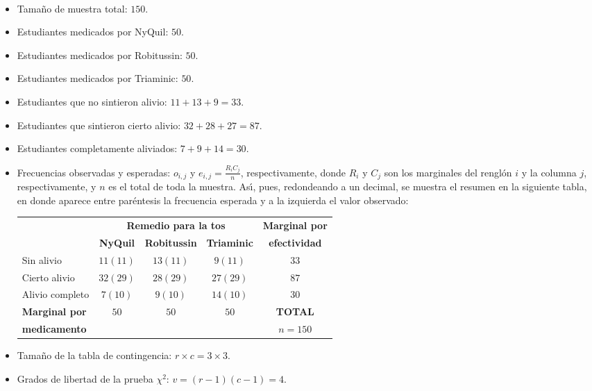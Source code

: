 \begin{solucion}
 \begin{datos}
  $\phantom{0}$
  \begin{itemize}
   \item Tamaño de muestra total: $150$.
   \item Estudiantes medicados por NyQuil: $50$.
   \item Estudiantes medicados por Robitussin: $50$.
   \item Estudiantes medicados por Triaminic: $50$.
   \item Estudiantes que no sintieron alivio: $11 + 13 + 9 = 33$.
   \item Estudiantes que sintieron cierto alivio: $32 + 28 + 27 = 87$.
   \item Estudiantes completamente aliviados: $7 + 9 + 14 = 30$.
   \item Frecuencias observadas y esperadas: $o_{i,j}$
   y $e_{i,j}=\frac{R_i C_j}{n}$, respectivamente,
   donde $R_i$ y $C_j$ son los marginales del rengl\'on $i$ y la columna $j$,
   respectivamente, y $n$ es el total de toda la muestra.
   As\'{\i}, pues, redondeando a un decimal, se muestra el resumen 
   en la siguiente tabla,
   en donde aparece entre par\'entesis la frecuencia esperada
   y a la izquierda el valor observado:
   \begin{center}
    \begin{tabular}{lccc|c}
     & \multicolumn{3}{c}{\textbf{Remedio para la tos}} &
     \textbf{Marginal por} \\
     \cline{2-4}
     & \textbf{NyQuil} & \textbf{Robitussin} & \textbf{Triaminic} &
     \textbf{efectividad} \\
     \hline 
     Sin alivio & $11 (11)$ & $13 (11)$ & $9 (11)$ & $33$ \\
     Cierto alivio & $32 (29)$ & $28 (29)$ & $27 (29)$ & $87$ \\
     Alivio completo & $7 (10)$ & $9 (10)$ & $14 (10)$ & $30$ \\
     \hline 
     \textbf{Marginal por} & \multirow{2}{*}{$50$} & \multirow{2}{*}{$50$} &
     \multirow{2}{*}{$50$} & \textbf{TOTAL} \\
     \textbf{medicamento} & & & & $n = 150$
    \end{tabular}
   \end{center}
   \item Tama\~no de la tabla de contingencia: $r\times c = 3\times 3$.
   \item Grados de libertad de la prueba $\chi^2$: $v = (r-1)(c-1) = 4$.
  \end{itemize}
 \end{datos}
 

\end{solucion}
